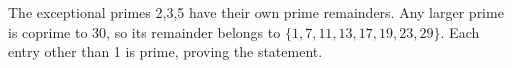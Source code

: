 The exceptional primes 2,3,5 have their own prime remainders. Any larger prime is coprime to 30, so its remainder belongs to $\{1,7,11,13,17,19,23,29\}$. Each entry other than 1 is prime, proving the statement.
